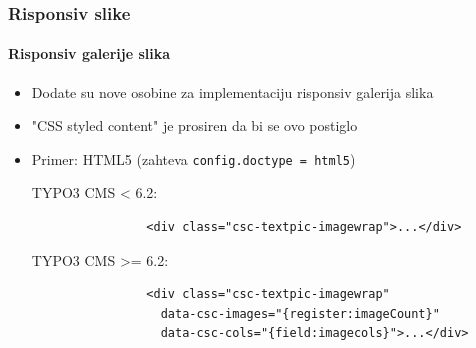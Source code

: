 \begin{frame}[fragile]
	\frametitle{Risponsiv slike}
	\framesubtitle{Risponsiv galerije slika}

	\begin{itemize}
		\item Dodate su nove osobine za implementaciju risponsiv galerija slika
		\item "CSS styled content" je prosiren da bi se ovo postiglo
		\item Primer: HTML5 (zahteva \texttt{config.doctype = html5})\newline

			TYPO3 CMS < 6.2:


			\begin{lstlisting}
				<div class="csc-textpic-imagewrap">...</div>
			\end{lstlisting}

			TYPO3 CMS >= 6.2:

			\begin{lstlisting}
				<div class="csc-textpic-imagewrap"
				  data-csc-images="{register:imageCount}"
				  data-csc-cols="{field:imagecols}">...</div>
			\end{lstlisting}

	\end{itemize}

\end{frame}


